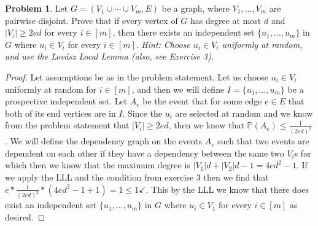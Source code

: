 \documentclass[11pt, letter]{amsart}
\theoremstyle{definition}
\newtheorem{problem}{Problem}[]
\newcommand{\p}[0]{\mathbb{P}}
\begin{document}
\clearpage
\begin{problem}
  Let $G = (V_1 \cup \cdots \cup V_m, E)$ be a graph, where $V_1, \dots, V_m$ are pairwise disjoint.  Prove that if every vertex of $G$ has degree at most $d$ and $|V_i| \geq 2ed$ for every $i \in [m]$, then there exists an independent set $\{u_1, \dots, u_m\}$ in $G$ where $u_i \in V_i$ for every $i \in [m]$.  \textit{Hint: Choose $u_i \in V_i$ uniformly at random, and use the Lov\'asz Local Lemma (also, see Exercise 3).}
\end{problem}

\begin{proof}
    Let assumptions be as in the problem statement. Let us choose $u_i \in V_i$ uniformly at random for $i\in [m]$, and then we will define $I = \{u_1, ..., u_m\}$ be a prospective independent set. Let $A_e$ be the event that for some edge $e\in E$ that both of its end vertices are in $I$. Since the $u_i$ are selected at random and we know from the problem statement that $|V_i| \geq 2ed$, then we know that $\p(A_e) \leq \frac{1}{(2ed)^2}$. We will define the dependency graph on the events $A_e$ such that two events are dependent on each other if they have a dependency between the same two $V_i$s for which then we know that the maximum degree is $|V_1|d+|V_2|d - 1 = 4ed^2 - 1$. If we apply the LLL and the condition from exercise 3 then we find that $e * \frac{1}{(2ed)^2} * (4ed^2 - 1 + 1) = 1 \leq 1 \checkmark$. This by the LLL we know that there does exist an independent set $\{u_1, ..., u_m\}$ in $G$ where $u_i\in V_1$ for every $i \in [m]$ as desired.
\end{proof}

\clearpage
\end{document}
